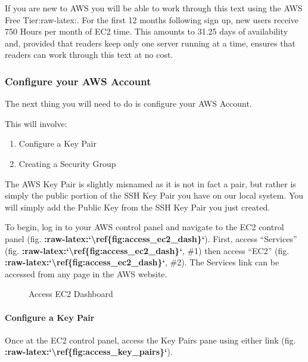 \documentclass[letterpaper,10pt,english]{sphinxmanual}
\begin{document}
If you are new to AWS you will be able to work through this text using
the AWS Free Tier:raw-latex:.
For the first 12 months following sign up, new users receive 750 Hours
per month of EC2 time. This amounts to 31.25 days of availability and,
provided that readers keep only one server running at a time, ensures
that readers can work through this text at no cost.


\subsubsection{Configure your AWS Account}
\label{\detokenize{01-amazon-web-services:Configure-your-AWS-Account}}
The next thing you will need to do is configure your AWS Account.

This will involve:
\begin{enumerate}
\item {} 
Configure a Key Pair

\item {} 
Creating a Security Group

\end{enumerate}

The AWS Key Pair is slightly misnamed as it is not in fact a pair, but
rather is simply the public portion of the SSH Key Pair you have on our
local system. You will simply add the Public Key from the SSH Key Pair
you just created.

To begin, log in to your AWS control panel and navigate to the EC2
control panel (fig. {\color{red}\bfseries{}:raw-latex:{}`\textbackslash{}ref\{fig:access\_ec2\_dash\}{}`}). First,
access “Services” (fig. {\color{red}\bfseries{}:raw-latex:{}`\textbackslash{}ref\{fig:access\_ec2\_dash\}{}`}, \#1) then
access “EC2” (fig. {\color{red}\bfseries{}:raw-latex:{}`\textbackslash{}ref\{fig:access\_ec2\_dash\}{}`}, \#2). The
Services link can be accessed from any page in the AWS website.

\begin{figure}[htbp]
\centering
\capstart

\noindent{}
\caption{Access EC2 Dashboard}\label{\detokenize{01-amazon-web-services:id32}}\end{figure}


\paragraph{Configure a Key Pair}
\label{\detokenize{01-amazon-web-services:Configure-a-Key-Pair}}
Once at the EC2 control panel, access the Key Pairs pane using either
link (fig. {\color{red}\bfseries{}:raw-latex:{}`\textbackslash{}ref\{fig:access\_key\_pairs\}{}`}).
\end{document}
